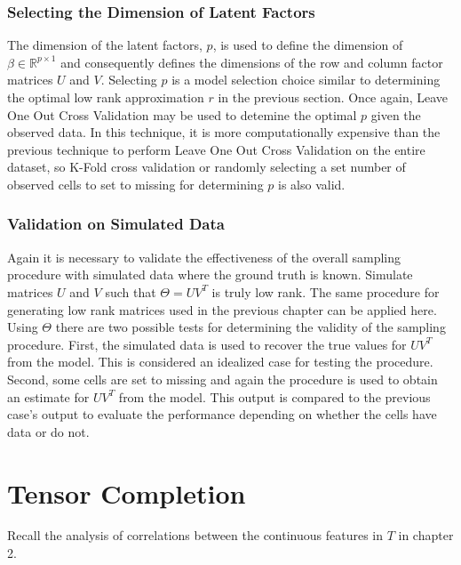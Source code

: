 \documentclass[12pt,twoside]{dukestatscithesis}
\theoremstyle{definition}
\theoremstyle{definition}
\theoremstyle{definition}
\theoremstyle{remark}
\begin{document}
\subsection{Selecting the Dimension of Latent
Factors}\label{selecting-the-dimension-of-latent-factors}

The dimension of the latent factors, \(p\), is used to define the
dimension of \(\beta \in \mathbb{R}^{p \times 1}\) and consequently
defines the dimensions of the row and column factor matrices \(U\) and
\(V\). Selecting \(p\) is a model selection choice similar to
determining the optimal low rank approximation \(r\) in the previous
section. Once again, Leave One Out Cross Validation may be used to
detemine the optimal \(p\) given the observed data. In this technique,
it is more computationally expensive than the previous technique to
perform Leave One Out Cross Validation on the entire dataset, so K-Fold
cross validation or randomly selecting a set number of observed cells to
set to missing for determining \(p\) is also valid.

\subsection{Validation on Simulated
Data}\label{validation-on-simulated-data}

Again it is necessary to validate the effectiveness of the overall
sampling procedure with simulated data where the ground truth is known.
Simulate matrices \(U\) and \(V\) such that \(\Theta = UV^T\) is truly
low rank. The same procedure for generating low rank matrices used in
the previous chapter can be applied here. Using \(\Theta\) there are two
possible tests for determining the validity of the sampling procedure.
First, the simulated data is used to recover the true values for
\(UV^T\) from the model. This is considered an idealized case for
testing the procedure. Second, some cells are set to missing and again
the procedure is used to obtain an estimate for \(UV^T\) from the model.
This output is compared to the previous case's output to evaluate the
performance depending on whether the cells have data or do not.

\chapter{Tensor Completion}\label{tensor-completion}

Recall the analysis of correlations between the continuous features in
\(T\) in chapter 2.
\end{document}
